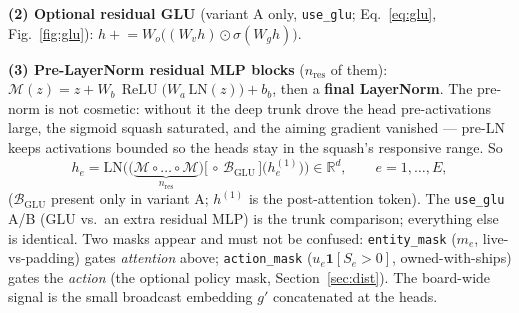 \documentclass[11pt]{article}
\newcommand{\R}{\mathbb{R}}
\newcommand{\relu}{\operatorname{ReLU}}
\begin{document}
\smallskip\noindent\textbf{(2) Optional residual GLU} (variant A only, \texttt{use\_glu};
Eq.~\ref{eq:glu}, Fig.~\ref{fig:glu}): $h \mathrel{+}= W_o\big((W_v h)\odot\sigma(W_g h)\big)$.

\smallskip\noindent\textbf{(3) Pre-LayerNorm residual MLP blocks} ($n_{\mathrm{res}}$ of them):
$\mathcal M(z)=z+W_b\,\relu\!\big(W_a\,\mathrm{LN}(z)\big)+b_b$, then a \textbf{final LayerNorm}. The
pre-norm is not cosmetic: without it the deep trunk drove the head pre-activations large, the sigmoid
squash saturated, and the aiming gradient vanished --- pre-LN keeps activations bounded so the heads
stay in the squash's responsive range. So
\begin{equation}
h_e = \mathrm{LN}\Big(\big(\underbrace{\mathcal M\circ\dots\circ\mathcal M}_{n_{\mathrm{res}}}\big)
      \big[\,\circ\,\mathcal B_{\mathrm{GLU}}\,\big]\big(h^{(1)}_e\big)\Big)\in\R^{d},
\qquad e=1,\dots,E,
\end{equation}
($\mathcal B_{\mathrm{GLU}}$ present only in variant A; $h^{(1)}$ is the post-attention token). The
\texttt{use\_glu} A/B (GLU vs.\ an extra residual MLP) is the trunk comparison; everything else is identical.
Two masks appear and must not be confused: \texttt{entity\_mask} ($m_e$, live-vs-padding) gates
\emph{attention} above; \texttt{action\_mask} ($u_e\mathbf 1[S_e>0]$, owned-with-ships) gates the
\emph{action} (the optional policy mask, Section~\ref{sec:dist}). The board-wide signal is the small
broadcast embedding $g'$ concatenated at the heads.
\end{document}
